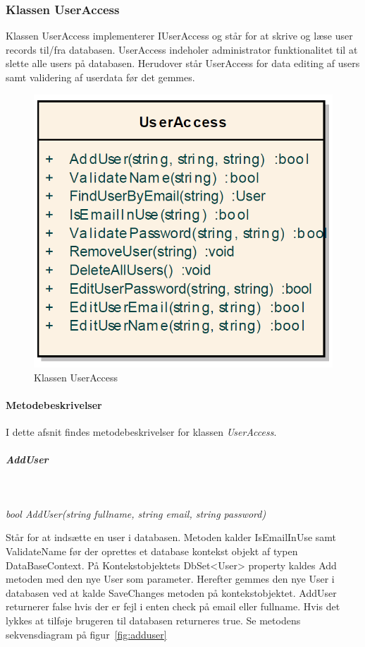 \subsubsection{Klassen UserAccess}
Klassen UserAccess implementerer IUserAccess og står for at skrive og læse user records til/fra databasen.
UserAccess indeholer administrator funktionalitet til at slette alle users på databasen. Herudover står UserAccess for data editing af users samt validering af userdata før det gemmes.

\begin{figure}[h]
\centering
\includegraphics[width=0.4\linewidth]{figs/implementering/UserAccessClass.PNG}
\caption{Klassen UserAccess}
\label{fig:UserAccessClass}
\end{figure}


\paragraph{Metodebeskrivelser}
I dette afsnit findes metodebeskrivelser for klassen \textit{UserAccess}.

\subparagraph{AddUser}\

\textit{bool AddUser(string fullname, string email, string password)}

Står for at indsætte en user i databasen. Metoden kalder IsEmailInUse samt ValidateName før der oprettes et database kontekst objekt af typen DataBaseContext. På Kontekstobjektets DbSet<User> property kaldes Add metoden med den nye User som parameter. Herefter gemmes den nye User i databasen ved at kalde SaveChanges metoden på kontekstobjektet. AddUser returnerer false hvis der er fejl i enten check på email eller fullname. Hvis det lykkes at tilføje brugeren til databasen returneres true. Se metodens sekvensdiagram på figur~\ref{fig:adduser}

